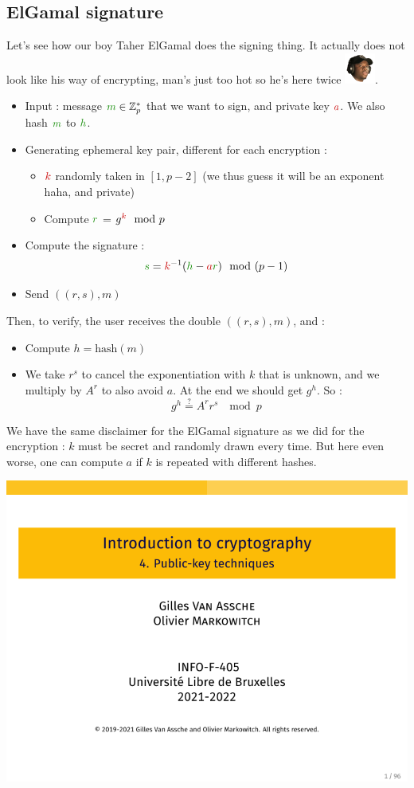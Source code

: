 \documentclass[../Cryptography.tex]{subfiles}
\begin{document}
\subsection{ElGamal signature}
Let's see how our boy Taher ElGamal does the signing thing. It actually does not look like his way of encrypting, man's just too hot so he's here twice \includegraphics[height=1cm]{images/bigshaq.png}.

\begin{itemize}
    \item Input : message $\green{m}\in \mathbb{Z}_p ^*$ that we want to sign, and private key $\rouge{a}$. We also hash $\green{m}$ to $\green{h}$.
    \item Generating ephemeral key pair, different for each encryption :
    \begin{itemize}[label=$\star$]
        \item $\rouge{k}$ randomly taken in $[1, p-2]$ (we thus guess it will be an exponent haha, and private)
        \item Compute $\green{r}$ = $g^\rouge{k} \mod{p}$
    \end{itemize}
    \item Compute the signature : $$\green{s} = \rouge{k}^{-1}(\green{h}-\rouge{a}\green{r})\mod{(p-1)}$$
    \item Send $((r,s),m)$
\end{itemize}

Then, to verify, the user receives the double $((r,s), m)$, and :
\begin{itemize}
    \item Compute $h = \mathrm{hash}(m)$
    \item We take $r^s$ to cancel the exponentiation with $k$ that is unknown, and we multiply by $A^r$ to also avoid $a$. At the end we should get $g^h$. So :
    $$g^h \stackrel{?}{=}A^r r^s \; \mod{p}$$
\end{itemize}

We have the same disclaimer for the ElGamal signature as we did for the encryption : $k$ must be secret and randomly drawn every time. But here even worse, one can compute $a$ if $k$ is repeated with different hashes.

\begin{center}
    \includegraphics[width=0.6\linewidth, page=83]{Slides/4-Public.pdf}
\end{center}
\end{document}
